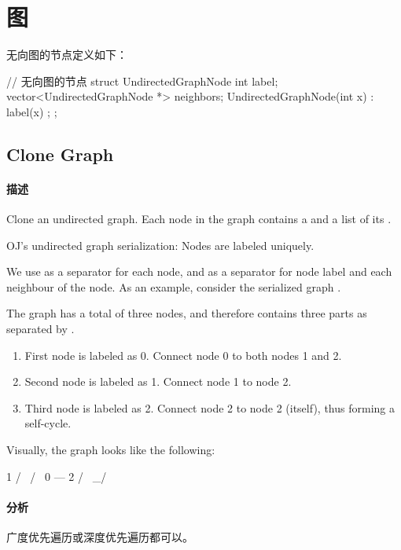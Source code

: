 \chapter{图}

无向图的节点定义如下：
\begin{Code}
// 无向图的节点
struct UndirectedGraphNode {
    int label;
    vector<UndirectedGraphNode *> neighbors;
    UndirectedGraphNode(int x) : label(x) {};
};
\end{Code}


\section{Clone Graph} %
\label{sec:clone-graph}


\subsubsection{描述}
Clone an undirected graph. Each node in the graph contains a  and a list of its .


OJ's undirected graph serialization:
Nodes are labeled uniquely.

We use \code{\#} as a separator for each node, and \code{,} as a separator for node label and each neighbour of the node.
As an example, consider the serialized graph .

The graph has a total of three nodes, and therefore contains three parts as separated by \code{\#}.
\begin{enumerate}
\item First node is labeled as 0. Connect node 0 to both nodes 1 and 2.
\item Second node is labeled as 1. Connect node 1 to node 2.
\item Third node is labeled as 2. Connect node 2 to node 2 (itself), thus forming a self-cycle.
\end{enumerate}

Visually, the graph looks like the following:
\begin{Code}
       1
      / \
     /   \
    0 --- 2
         / \
         \_/
\end{Code}


\subsubsection{分析}
广度优先遍历或深度优先遍历都可以。


